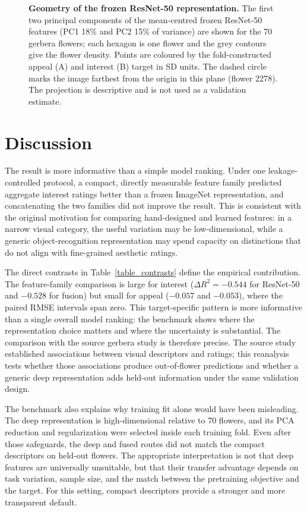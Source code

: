 \documentclass[10pt,letterpaper]{article}
\begin{document}
\begin{figure}[!h]
\caption{\textbf{Geometry of the frozen ResNet-50 representation.}
The first two principal components of the mean-centred frozen ResNet-50
features (PC1 18\% and PC2 15\% of variance) are shown for the 70 gerbera
flowers; each hexagon is one flower and the grey contours give the flower
density. Points are coloured by the fold-constructed appeal (A) and
interest (B) target in SD units. The dashed circle marks the image farthest
from the origin in this plane (flower 2278). The projection is descriptive
and is not used as a validation estimate.}
\label{fig:resnetspace}
\end{figure}

\section*{Discussion}
The result is more informative than a simple model ranking. Under one leakage-controlled protocol, a compact, directly measurable feature family predicted aggregate interest ratings better than a frozen ImageNet representation, and concatenating the two families did not improve the result. This is consistent with the original motivation for comparing hand-designed and learned features: in a narrow visual category, the useful variation may be low-dimensional, while a generic object-recognition representation may spend capacity on distinctions that do not align with fine-grained aesthetic ratings.

The direct contrasts in Table~\ref{table_contrasts} define the empirical contribution. The feature-family comparison is large for interest ($\Delta R^2 = -0.544$ for ResNet-50 and $-0.528$ for fusion) but small for appeal ($-0.057$ and $-0.053$), where the paired RMSE intervals span zero. This target-specific pattern is more informative than a single overall model ranking: the benchmark shows where the representation choice matters and where the uncertainty is substantial. The comparison with the source gerbera study is therefore precise. The source study established associations between visual descriptors and ratings; this reanalysis tests whether those associations produce out-of-flower predictions and whether a generic deep representation adds held-out information under the same validation design.

The benchmark also explains why training fit alone would have been misleading. The deep representation is high-dimensional relative to 70 flowers, and its PCA reduction and regularization were selected inside each training fold. Even after those safeguards, the deep and fused routes did not match the compact descriptors on held-out flowers. The appropriate interpretation is not that deep features are universally unsuitable, but that their transfer advantage depends on task variation, sample size, and the match between the pretraining objective and the target. For this setting, compact descriptors provide a stronger and more transparent default.
\end{document}
